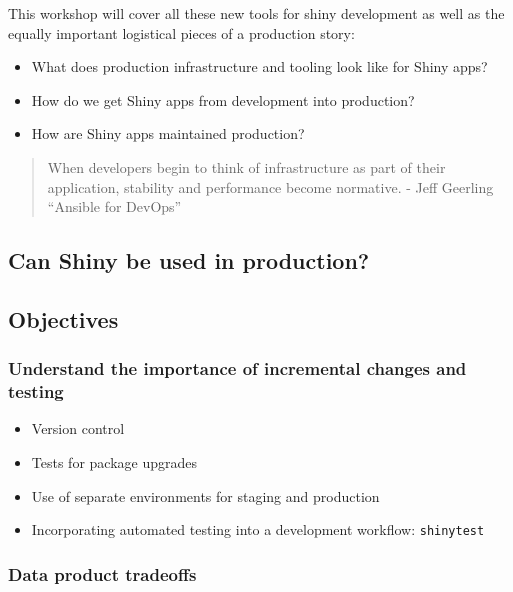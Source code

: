 \documentclass[]{book}
\providecommand{\tightlist}{%
  \setlength{\itemsep}{0pt}\setlength{\parskip}{0pt}}
\begin{document}
This workshop will cover all these new tools for shiny development as
well as the equally important logistical pieces of a production story:

\begin{itemize}
\tightlist
\item
  What does production infrastructure and tooling look like for Shiny
  apps?
\item
  How do we get Shiny apps from development into production?
\item
  How are Shiny apps maintained production?
\end{itemize}

\begin{quote}
When developers begin to think of infrastructure as part of their
application, stability and performance become normative. - Jeff Geerling
``Ansible for DevOps''
\end{quote}

\hypertarget{can-shiny-be-used-in-production}{%
\subsection{Can Shiny be used in
production?}\label{can-shiny-be-used-in-production}}

\hypertarget{objectives}{%
\subsection{Objectives}\label{objectives}}

\hypertarget{understand-the-importance-of-incremental-changes-and-testing}{%
\subsubsection{Understand the importance of incremental changes and
testing}\label{understand-the-importance-of-incremental-changes-and-testing}}

\begin{itemize}
\tightlist
\item
  Version control
\item
  Tests for package upgrades
\item
  Use of separate environments for staging and production
\item
  Incorporating automated testing into a development workflow:
  \texttt{shinytest}
\end{itemize}

\hypertarget{data-product-tradeoffs}{%
\subsubsection{Data product tradeoffs}\label{data-product-tradeoffs}}
\end{document}
